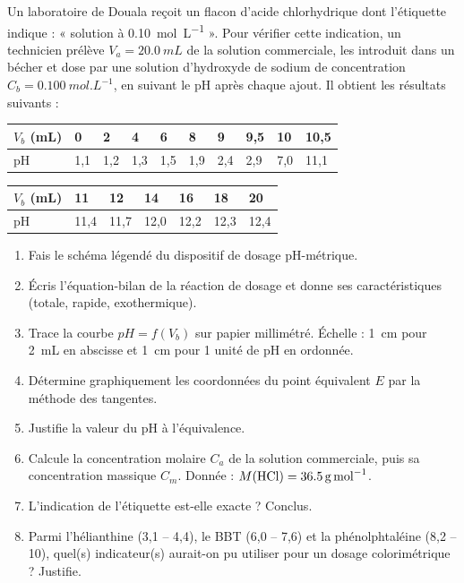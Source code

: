 \documentclass[11pt]{article}
\begin{document}
\begin{exercice}
Un laboratoire de Douala reçoit un flacon d'acide chlorhydrique dont l'étiquette indique : « solution à \SI{0,10}{mol.L^{-1}} ». Pour vérifier cette indication, un technicien prélève $V_a = \SI{20,0}{mL}$ de la solution commerciale, les introduit dans un bécher et dose par une solution d'hydroxyde de sodium de concentration $C_b = \SI{0,100}{mol.L^{-1}}$, en suivant le pH après chaque ajout. Il obtient les résultats suivants :

\begin{center}
\begin{tabularx}{\linewidth}{|l|X|X|X|X|X|X|X|X|X|}
\hline
\rowcolor{popblueL} $V_b$ (mL) & 0 & 2 & 4 & 6 & 8 & 9 & 9,5 & 10 & 10,5 \\
\hline
pH & 1,1 & 1,2 & 1,3 & 1,5 & 1,9 & 2,4 & 2,9 & 7,0 & 11,1 \\
\hline
\end{tabularx}
\end{center}
\begin{center}
\begin{tabularx}{\linewidth}{|l|X|X|X|X|X|X|}
\hline
\rowcolor{popblueL} $V_b$ (mL) & 11 & 12 & 14 & 16 & 18 & 20 \\
\hline
pH & 11,4 & 11,7 & 12,0 & 12,2 & 12,3 & 12,4 \\
\hline
\end{tabularx}
\end{center}

\begin{enumerate}
\item Fais le schéma légendé du dispositif de dosage pH-métrique.
\item Écris l'équation-bilan de la réaction de dosage et donne ses caractéristiques (totale, rapide, exothermique).
\item Trace la courbe $pH = f(V_b)$ sur papier millimétré. Échelle : \SI{1}{cm} pour \SI{2}{mL} en abscisse et \SI{1}{cm} pour 1 unité de pH en ordonnée.
\item Détermine graphiquement les coordonnées du point équivalent $E$ par la méthode des tangentes.
\item Justifie la valeur du pH à l'équivalence.
\item Calcule la concentration molaire $C_a$ de la solution commerciale, puis sa concentration massique $C_m$. Donnée : $M(\ce{HCl}) = \SI{36,5}{g.mol^{-1}}$.
\item L'indication de l'étiquette est-elle exacte ? Conclus.
\item Parmi l'hélianthine (3,1 -- 4,4), le BBT (6,0 -- 7,6) et la phénolphtaléine (8,2 -- 10), quel(s) indicateur(s) aurait-on pu utiliser pour un dosage colorimétrique ? Justifie.
\end{enumerate}
\end{exercice}
\end{document}
